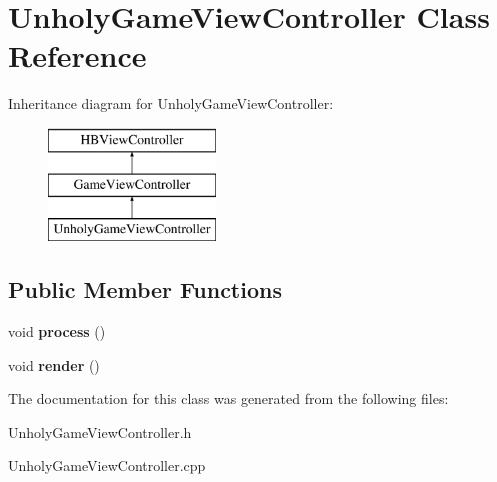 \hypertarget{class_unholy_game_view_controller}{\section{Unholy\-Game\-View\-Controller Class Reference}
\label{class_unholy_game_view_controller}
}
Inheritance diagram for Unholy\-Game\-View\-Controller\-:\begin{figure}[H]
\begin{center}
\leavevmode
\includegraphics[height=3.000000cm]{class_unholy_game_view_controller}
\end{center}
\end{figure}
\subsection*{Public Member Functions}
\begin{DoxyCompactItemize}
\item 
\hypertarget{class_unholy_game_view_controller_a52f2297f438597e575049f066683f78a}{void {\bfseries process} ()}\label{class_unholy_game_view_controller_a52f2297f438597e575049f066683f78a}

\item 
\hypertarget{class_unholy_game_view_controller_a15d9253674a9c6a10f9196611bfe1b07}{void {\bfseries render} ()}\label{class_unholy_game_view_controller_a15d9253674a9c6a10f9196611bfe1b07}

\end{DoxyCompactItemize}


The documentation for this class was generated from the following files\-:\begin{DoxyCompactItemize}
\item 
Unholy\-Game\-View\-Controller.\-h\item 
Unholy\-Game\-View\-Controller.\-cpp\end{DoxyCompactItemize}
